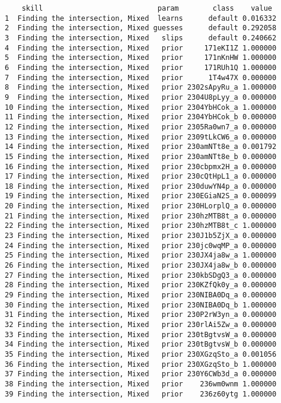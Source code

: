 \documentclass{article}
\begin{document}
\begin{verbatim}
    skill                           param        class    value
1  Finding the intersection, Mixed  learns      default 0.016332
2  Finding the intersection, Mixed guesses      default 0.292058
3  Finding the intersection, Mixed   slips      default 0.240662
4  Finding the intersection, Mixed   prior     171eKI1Z 1.000000
5  Finding the intersection, Mixed   prior     171nKnHW 1.000000
6  Finding the intersection, Mixed   prior     171RUh1Q 1.000000
7  Finding the intersection, Mixed   prior      1T4w47X 0.000000
8  Finding the intersection, Mixed   prior 2302sApyRu_a 1.000000
9  Finding the intersection, Mixed   prior 2304U8pLyy_a 0.000000
10 Finding the intersection, Mixed   prior 2304YbHCok_a 1.000000
11 Finding the intersection, Mixed   prior 2304YbHCok_b 0.000000
12 Finding the intersection, Mixed   prior 2305Ra0wn7_a 0.000000
13 Finding the intersection, Mixed   prior 2309tLkCW6_a 0.000000
14 Finding the intersection, Mixed   prior 230amNTt8e_a 0.001792
15 Finding the intersection, Mixed   prior 230amNTt8e_b 0.000000
16 Finding the intersection, Mixed   prior 230cbpmx2H_a 0.000000
17 Finding the intersection, Mixed   prior 230cQtHpL1_a 0.000000
18 Finding the intersection, Mixed   prior 230duwYN4p_a 0.000000
19 Finding the intersection, Mixed   prior 230EGiaN2S_a 0.000099
20 Finding the intersection, Mixed   prior 230HLorplQ_a 0.000000
21 Finding the intersection, Mixed   prior 230hzMTB8t_a 0.000000
22 Finding the intersection, Mixed   prior 230hzMTB8t_c 1.000000
23 Finding the intersection, Mixed   prior 230J1b5ZjX_a 0.000000
24 Finding the intersection, Mixed   prior 230jc0wqMP_a 0.000000
25 Finding the intersection, Mixed   prior 230JX4ja8w_a 1.000000
26 Finding the intersection, Mixed   prior 230JX4ja8w_b 0.000000
27 Finding the intersection, Mixed   prior 230kbSDgQ3_a 0.000000
28 Finding the intersection, Mixed   prior 230KZfQk0y_a 0.000000
29 Finding the intersection, Mixed   prior 230NIBA0Dq_a 0.000000
30 Finding the intersection, Mixed   prior 230NIBA0Dq_b 1.000000
31 Finding the intersection, Mixed   prior 230P2rW3yn_a 0.000000
32 Finding the intersection, Mixed   prior 230rlAi5Zw_a 0.000000
33 Finding the intersection, Mixed   prior 230tBgtvsW_a 0.000000
34 Finding the intersection, Mixed   prior 230tBgtvsW_b 0.000000
35 Finding the intersection, Mixed   prior 230XGzqSto_a 0.001056
36 Finding the intersection, Mixed   prior 230XGzqSto_b 1.000000
37 Finding the intersection, Mixed   prior 230Y6CWb3d_a 0.000000
38 Finding the intersection, Mixed   prior    236wm0wnm 1.000000
39 Finding the intersection, Mixed   prior    236z60ytg 1.000000

\end{verbatim}
\end{document}

